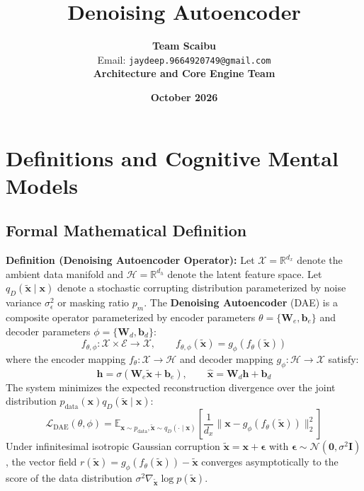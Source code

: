 \documentclass[11pt,a4paper]{article}
\title{\textbf{Denoising Autoencoder}}
\author{\textbf{Team Scaibu} \\ \small Email: \texttt{jaydeep.9664920749@gmail.com} \\ \small \textbf{Architecture and Core Engine Team}}
\date{\textbf{October 2026}}
\theoremstyle{definition}
\begin{document}
\maketitle

\section{Definitions and Cognitive Mental Models}

\subsection{Formal Mathematical Definition}
\textbf{Definition (Denoising Autoencoder Operator):}
Let $\mathcal{X} = \mathbb{R}^{d_x}$ denote the ambient data manifold and $\mathcal{H} = \mathbb{R}^{d_h}$ denote the latent feature space. Let $q_D(\tilde{\mathbf{x}} \mid \mathbf{x})$ denote a stochastic corrupting distribution parameterized by noise variance $\sigma_\epsilon^2$ or masking ratio $p_m$. The \textbf{Denoising Autoencoder} (DAE) is a composite operator parameterized by encoder parameters $\theta = \{\mathbf{W}_e, \mathbf{b}_e\}$ and decoder parameters $\phi = \{\mathbf{W}_d, \mathbf{b}_d\}$:
{\boldmath
\begin{equation}
f_{\theta, \phi}: \mathcal{X} \times \mathcal{E} \longrightarrow \mathcal{X}, \qquad f_{\theta, \phi}(\tilde{\mathbf{x}}) = g_\phi(f_\theta(\tilde{\mathbf{x}}))
\end{equation}
}
where the encoder mapping $f_\theta: \mathcal{X} \to \mathcal{H}$ and decoder mapping $g_\phi: \mathcal{H} \to \mathcal{X}$ satisfy:
{\boldmath
\begin{equation}
\mathbf{h} = \sigma(\mathbf{W}_e \tilde{\mathbf{x}} + \mathbf{b}_e), \qquad \hat{\mathbf{x}} = \mathbf{W}_d \mathbf{h} + \mathbf{b}_d
\end{equation}
}
The system minimizes the expected reconstruction divergence over the joint distribution $p_{\text{data}}(\mathbf{x}) q_D(\tilde{\mathbf{x}} \mid \mathbf{x})$:
{\boldmath
\begin{equation}
\mathcal{L}_{\text{DAE}}(\theta, \phi) = \mathbb{E}_{\mathbf{x} \sim p_{\text{data}}, \tilde{\mathbf{x}} \sim q_D(\cdot \mid \mathbf{x})} \left[ \frac{1}{d_x} \|\mathbf{x} - g_\phi(f_\theta(\tilde{\mathbf{x}}))\|_2^2 \right]
\end{equation}
}
Under infinitesimal isotropic Gaussian corruption $\tilde{\mathbf{x}} = \mathbf{x} + \boldsymbol{\epsilon}$ with $\boldsymbol{\epsilon} \sim \mathcal{N}(\mathbf{0}, \sigma^2 \mathbf{I})$, the vector field $r(\tilde{\mathbf{x}}) = g_\phi(f_\theta(\tilde{\mathbf{x}})) - \tilde{\mathbf{x}}$ converges asymptotically to the score of the data distribution $\sigma^2 \nabla_{\tilde{\mathbf{x}}} \log p(\tilde{\mathbf{x}})$.
\end{document}
